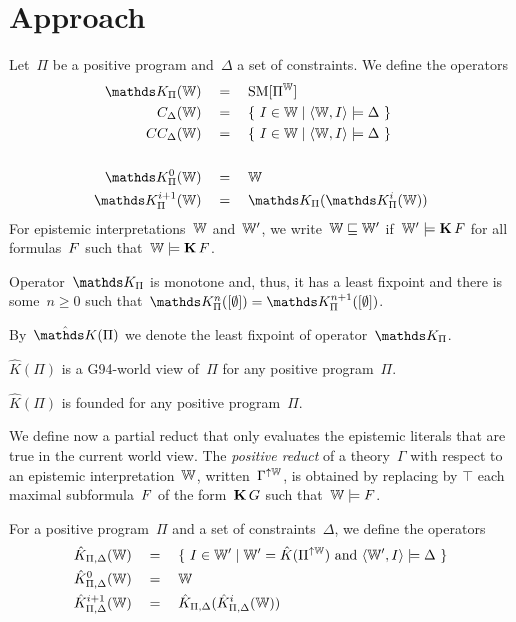 \section{Approach}\label{sec:approach}

Let~$\Pi$ be a positive program and~$\Delta$ a set of constraints.
%
We define the operators
\begin{align}
    \TKP{\wv} \quad&=\quad \SM[\Pi^\wv]
    \\
    C_{\Delta}(\wv) \quad&=\quad \{ \ I \in \wv \mid \tuple{\wv,I} \models \Delta \ \}
    \\
    CC_{\Delta}(\wv) \quad&=\quad \{ \ I \in \wv \mid \tuple{\wv,I} \models \Delta \ \}
    \\
    \\
    \TKPn{0}{\wv} \quad&=\quad \wv
    \\
    \TKPn{i+1}{\wv} \quad&=\quad \TKP{\TKPn{i}{\wv}}
\end{align}
For epistemic interpretations~$\mathbb{W}$ and~$\mathbb{W}'$, we write~$\mathbb{W} \sqsubseteq \mathbb{W}'$ if~$\mathbb{W}' \models \operatorname{\mathbf{K}}F$ for all formulas~$F$ such that~$\mathbb{W} \models \operatorname{\mathbf{K}}F$.

\begin{conjecture}
    \label{conj:tp.monotone}
    Operator~$\TKPo$ is monotone and, thus, it has a least fixpoint and there is some~$n \geq 0$ such that~$\TKPn{n}{[\emptyset]} = \TKPn{n+1}{[\emptyset]} $.
\end{conjecture}

By~$\TKPf$ we denote the least fixpoint of operator~$\TKPo$.

\begin{conjecture}
    \label{conj:tp.g94}
    $\hat{K}(\Pi)$ is a G94-world view of~$\Pi$ for any positive program~$\Pi$.
\end{conjecture}

\begin{conjecture}
    \label{conj:tp.founded}
    $\hat{K}(\Pi)$ is founded for any positive program~$\Pi$.
\end{conjecture}


We define now a partial reduct that only evaluates the epistemic literals that are true in the current world view.
%
The \emph{positive reduct} of a theory~$\Gamma$ 
with respect to an epistemic interpretation~$\mathbb{W}$, written~$\Gamma^{\uparrow\mathbb{W}}$, is obtained by replacing by $\top$ each maximal subformula~$F$ of the form~$\operatorname{\mathbf{K}} G$ such that~$\mathbb{W} \models F$.


For a positive program~$\Pi$ and a set of constraints~$\Delta$, we define the operators
\begin{align}
    \hat{K}_{\Pi,\Delta}(\mathbb{W}) \quad&=\quad \{ \ I \in \mathbb{W}' \mid \mathbb{W}' =  \hat{K}(\Pi^{\uparrow\mathbb{W}}) \text{ and }\langle \mathbb{W}',I \rangle \models \Delta \ \}
    \\
    \hat{K}_{\Pi,\Delta}^0(\mathbb{W}) \quad&=\quad \mathbb{W}
    \\
    \hat{K}_{\Pi,\Delta}^{i+1}(\mathbb{W}) \quad&=\quad \hat{K}_{\Pi,\Delta}(\hat{K}_{\Pi,\Delta}^i(\mathbb{W}))
\end{align}

